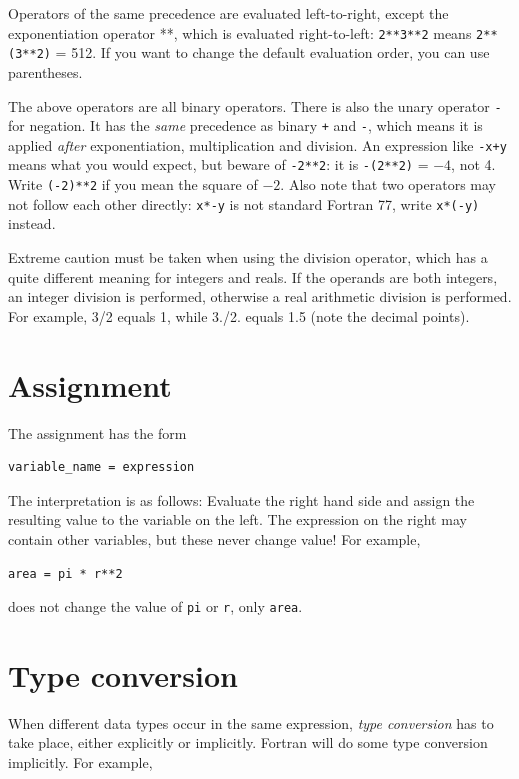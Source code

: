 Operators of the same precedence are evaluated left-to-right, except the exponentiation operator **, which is evaluated right-to-left: \texttt{2**3**2} means \texttt{2**(3**2)} = 512. If you want to change the default evaluation order, you can use parentheses.

The above operators are all binary operators. There is also the unary operator \texttt{-} for negation. It has the \emph{same} precedence as binary \texttt{+} and \texttt{-}, which means it is applied \emph{after} exponentiation, multiplication and division. An expression like \texttt{-x+y} means what you would expect, but beware of \texttt{-2**2}: it is \texttt{-(2**2)} = $-4$, not 4. Write \texttt{(-2)**2} if you mean the square of $-2$. Also note that two operators may not follow each other directly: \texttt{x*-y} is not standard Fortran 77, write \texttt{x*(-y)} instead.

Extreme caution must be taken when using the division operator, which has a quite different meaning for integers and reals. If the operands are both integers, an integer division is performed, otherwise a real arithmetic division is performed. For example, 3/2 equals 1, while 3./2. equals 1.5 (note the decimal points).

\section{Assignment}

The assignment has the form

\begin{lstlisting}[style=fortran77]
      variable_name = expression
\end{lstlisting}

The interpretation is as follows: Evaluate the right hand side and assign the resulting value to the variable on the left. The expression on the right may contain other variables, but these never change value! For example,

\begin{lstlisting}[style=fortran77]
      area = pi * r**2
\end{lstlisting}

does not change the value of \texttt{pi} or \texttt{r}, only \texttt{area}.

\section{Type conversion}

When different data types occur in the same expression, \emph{type conversion} has to take place, either explicitly or implicitly. Fortran will do some type conversion implicitly. For example,

